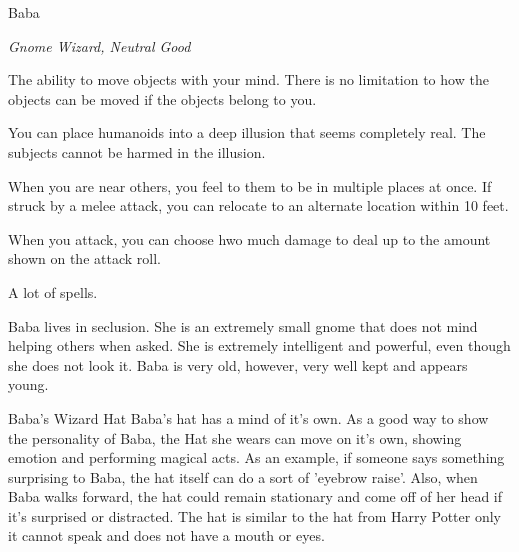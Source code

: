 \begin{monsterbox}{Baba}
	\begin{hangingpar}
		\textit{Gnome Wizard, Neutral Good}
	\end{hangingpar}
	\dndline%
	\basics[%
	armorclass = 24,
	hitpoints  = 302,
	speed      = 60 ft
	]
	\dndline%
	\stats[
	STR = \stat{8}, %
	DEX = \stat{16},
	CON = \stat{19},
	INT = \stat{20},
	WIS = \stat{20},
	CHA = \stat{19}
	]
	\dndline%
	\details[%
	languages = {Common, Elvish, Dwarvish, Gnomish, Halfling, Orc, Pandaren, Celestial, Draconic, Primordial},
	challenge = 20
	]
	\dndline%
	\begin{monsteraction}[Telekinesis]
		The ability to move objects with your mind. There is no limitation to how the objects can be moved if the objects belong to you.
	\end{monsteraction}	
	\begin{monsteraction}
		You can place humanoids into a deep illusion that seems completely real. The subjects cannot be harmed in the illusion.
	\end{monsteraction}	
	\begin{monsteraction}
		When you are near others, you feel to them to be in multiple places at once. If struck by a melee attack, you can relocate to an alternate location within 10 feet.
	\end{monsteraction}
	\begin{monsteraction}
		When you attack, you can choose hwo much damage to deal up to the amount shown on the attack roll.
	\end{monsteraction}
	\begin{monsteraction}[Spells]
		A lot of spells.
	\end{monsteraction}
	Baba lives in seclusion. She is an extremely small gnome that does not mind helping others when asked. She is extremely intelligent and powerful, even though she does not look it. Baba is very old, however, very well kept and appears young.
\end{monsterbox}

\begin{commentbox}{Baba's Wizard Hat}
	Baba's hat has a mind of it's own. As a good way to show the personality of Baba, the Hat she wears can move on it's own, showing emotion and performing magical acts. As an example, if someone says something surprising to Baba, the hat itself can do a sort of 'eyebrow raise'. Also, when Baba walks forward, the hat could remain stationary and come off of her head if it's surprised or distracted. The hat is similar to the hat from Harry Potter only it cannot speak and does not have a mouth or eyes.
\end{commentbox}

